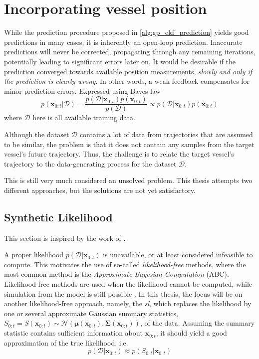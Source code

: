 \section{Incorporating vessel position}
While the prediction procedure proposed in \cref{alg:gp_ekf_prediction} yields good predictions in many cases, it is inherently an open-loop prediction. Inaccurate predictions will never be corrected, propagating through any remaining iterations, potentially leading to significant errors later on. It would be desirable if the prediction converged towards available position measurements, \textit{slowly and only if the prediction is clearly wrong}. In other words, a weak feedback compensates for minor prediction errors. Expressed using Bayes law
\begin{equation}\label{eq:gp_ekf_update_posterior}
    p(\boldsymbol{x}_{0:t} | \mathcal{D}) = \frac{p(\mathcal{D} | \boldsymbol{x}_{0:t}) p(\boldsymbol{x}_{0:t})}{p(\mathcal{D})} \propto p(\mathcal{D} | \boldsymbol{x}_{0:t})p(\boldsymbol{x}_{0:t})
\end{equation}
where $\mathcal{D}$ here is all available training data.

Although the dataset $\mathcal{D}$ contains a lot of data from trajectories that are assumed to be similar, the problem is that it does not contain any samples from the target vessel's future trajectory. Thus, the challenge is to relate the target vessel's trajectory to the data-generating process for the dataset $\mathcal{D}$.

This is still very much considered an unsolved problem. This thesis attempts two different approaches, but the solutions are not yet satisfactory.

\subsection{Synthetic Likelihood}
This section is inspired by the work of \citeauthor{praveen-syn} \cite{praveen-syn}.

A proper likelihood $p(\mathcal{D} | \boldsymbol{x}_{0:t})$ is unavailable, or at least considered infeasible to compute. This motivates the use of so-called \textit{likelihood-free} methods, where the most common method is the \textit{Approximate Bayesian Computation} (ABC). Likelihood-free methods are used when the likelihood cannot be computed, while simulation from the model is still possible \cite{likelihood_free,frazier2021bayesian}. In this thesis, the focus will be on another likelihood-free approach, namely, the \textit{\acrfull{sl}}, which replaces the likelihood by one or several approximate Gaussian summary statistics, $S_{0:t} = S(\boldsymbol{x}_{0:t}) \sim \mathcal{N}(\boldsymbol{\mu}(\boldsymbol{x}_{0:t}), \boldsymbol{\Sigma}(\boldsymbol{x}_{0:t}))$, of the data. Assuming the summary statistic contains sufficient information about $\boldsymbol{x}_{0:t}$, it should yield a good approximation of the true likelihood, i.e.
\begin{equation}
    p(\mathcal{D} | \boldsymbol{x}_{0:t}) \approx p(S_{0:t} | \boldsymbol{x}_{0:t})
\end{equation}


